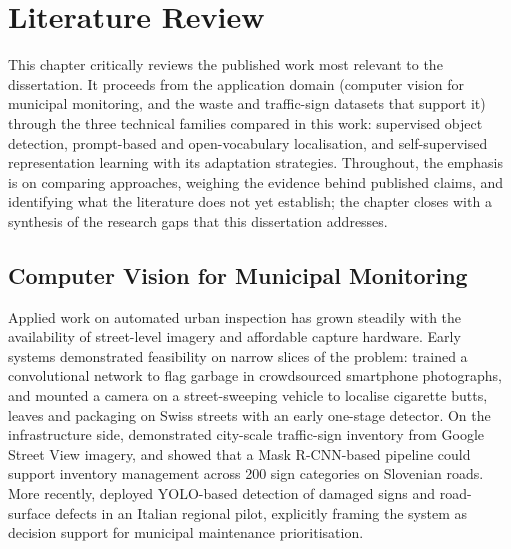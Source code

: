 
\chapter{Literature Review}
\label{ch:literature-review}

This chapter critically reviews the published work most relevant to the dissertation. It proceeds from the application domain (computer vision for municipal monitoring, and the waste and traffic-sign datasets that support it) through the three technical families compared in this work: supervised object detection, prompt-based and open-vocabulary localisation, and self-supervised representation learning with its adaptation strategies. Throughout, the emphasis is on comparing approaches, weighing the evidence behind published claims, and identifying what the literature does not yet establish; the chapter closes with a synthesis of the research gaps that this dissertation addresses.

\section{Computer Vision for Municipal Monitoring}
\label{sec:lr-municipal}

Applied work on automated urban inspection has grown steadily with the availability of street-level imagery and affordable capture hardware. Early systems demonstrated feasibility on narrow slices of the problem: \citet{mittal2016spotgarbage} trained a convolutional network to flag garbage in crowdsourced smartphone photographs, and \citet{rad2017computer} mounted a camera on a street-sweeping vehicle to localise cigarette butts, leaves and packaging on Swiss streets with an early one-stage detector. On the infrastructure side, \citet{balali2015detection} demonstrated city-scale traffic-sign inventory from Google Street View imagery, and \citet{tabernik2020deep} showed that a Mask R-CNN-based pipeline could support inventory management across 200 sign categories on Slovenian roads. More recently, \citet{merolla2025improving} deployed YOLO-based detection of damaged signs and road-surface defects in an Italian regional pilot, explicitly framing the system as decision support for municipal maintenance prioritisation.

